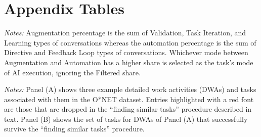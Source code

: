 \section{Appendix Tables}
\label{app:tables}


\newpage
\begin{landscape}
\begin{table}[htbp]
    \caption{Example O*NET Tasks Associated with Claude Conversations, and Calculated Augmentation vs.\ Automation Outcomes}
    \label{tab:example_anthropic_AI_tasks}
    \begin{center}
    
    \end{center}
    \footnotesize{\emph{Notes:} Augmentation percentage is the sum of Validation, Task Iteration, and Learning types of conversations whereas the automation percentage is the sum of Directive and Feedback Loop types of conversations. 
    Whichever mode between Augmentation and Automation has a higher share is selected as the task's mode of AI execution, ignoring the Filtered share.}
\end{table}
\end{landscape}




\newpage
\begin{landscape}
\begin{table}[p]
\caption{Example DWAs with Tasks in Multiple Occupations and the Tasks Surviving the ``Finding Similar Tasks'' Procedure}
\label{tab:DWA_tasks}


\vspace{0.3cm}

\footnotesize{\emph{Notes:} Panel (A) shows three example detailed work activities (DWAs) and tasks associated with them in the O*NET dataset. 
Entries highlighted with a red font are those that are dropped in the ``finding similar tasks'' procedure described in text. 
Panel (B) shows the set of tasks for DWAs of Panel (A) that successfully survive the ``finding similar tasks'' procedure.}
\end{table}
\end{landscape}




